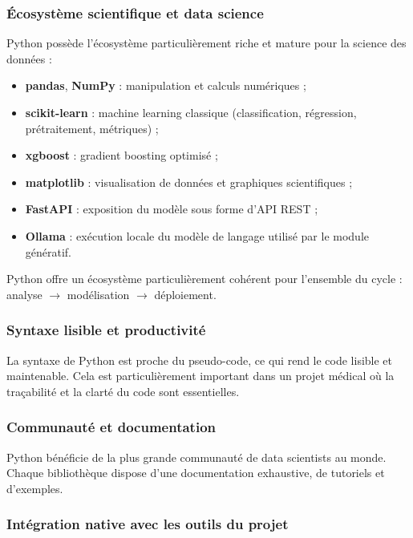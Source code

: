 \documentclass[12pt,a4paper]{report}
\begin{document}
\subsubsection{Écosystème scientifique et data science}

Python possède l'écosystème particulièrement riche et mature pour la science des données :
\begin{itemize}[leftmargin=1.5em]
 \item \textbf{pandas}, \textbf{NumPy} : manipulation et calculs numériques ;
 \item \textbf{scikit-learn} : machine learning classique (classification, régression,
 prétraitement, métriques) ;
 \item \textbf{xgboost} : gradient boosting optimisé ;
 \item \textbf{matplotlib} : visualisation de données et graphiques scientifiques ;
 \item \textbf{FastAPI} : exposition du modèle sous forme d'API REST ;
 \item \textbf{Ollama} : exécution locale du modèle de langage utilisé par le module génératif.
\end{itemize}
Python offre un écosystème particulièrement cohérent pour l'ensemble du
cycle : analyse $\rightarrow$ modélisation $\rightarrow$ déploiement.

\subsubsection{Syntaxe lisible et productivité}

La syntaxe de Python est proche du pseudo-code, ce qui rend le code lisible et maintenable.
Cela est particulièrement important dans un projet médical où la traçabilité et la clarté
du code sont essentielles.

\subsubsection{Communauté et documentation}

Python bénéficie de la plus grande communauté de data scientists au monde. Chaque
bibliothèque dispose d'une documentation exhaustive, de tutoriels et d'exemples.

\subsubsection{Intégration native avec les outils du projet}
\end{document}
